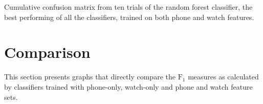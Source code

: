     \begin{table}
      \tabcolsep=0.11cm
      \centering
        
      \caption[Confusion matrix of the random forest classifier trained on both phone and watch features features]{Cumulative confusion matrix from ten trials of the random forest classifier, the best performing of all the classifiers, trained on both phone and watch features.}
      \label{tab:ConfusionMatrix_both_RandomForestClassifier}
    \end{table}
  
  \section{Comparison}
    This section presents graphs that directly compare the $\mathrm{F}_1$ measures as calculated by classifiers trained with phone-only, watch-only and phone and watch feature sets.
    
